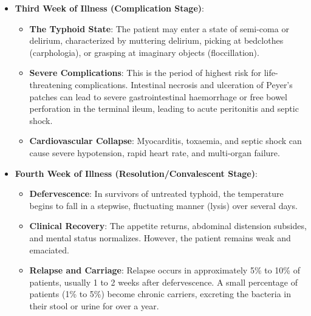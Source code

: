 \begin{itemize}
\begin{itemize}
    \item \textbf{Abdominal Distension and Organomegaly}: The abdomen becomes distended, and tenderness in the right iliac fossa is common. Palpation may reveal splenomegaly and hepatomegaly. Diarrhoea may develop, characteristically described as watery, green-brown ``pea-soup'' stools.
    \item \textbf{Toxic Appearance}: The patient appears severely ill, showing marked apathy, lethargy, and a dull, expressionless look.
  \end{itemize}
  \item \textbf{Third Week of Illness (Complication Stage)}:
  \begin{itemize}
    \item \textbf{The Typhoid State}: The patient may enter a state of semi-coma or delirium, characterized by muttering delirium, picking at bedclothes (carphologia), or grasping at imaginary objects (floccillation).
    \item \textbf{Severe Complications}: This is the period of highest risk for life-threatening complications. Intestinal necrosis and ulceration of Peyer's patches can lead to severe gastrointestinal haemorrhage or free bowel perforation in the terminal ileum, leading to acute peritonitis and septic shock.
    \item \textbf{Cardiovascular Collapse}: Myocarditis, toxaemia, and septic shock can cause severe hypotension, rapid heart rate, and multi-organ failure.
  \end{itemize}
  \item \textbf{Fourth Week of Illness (Resolution/Convalescent Stage)}:
  \begin{itemize}
    \item \textbf{Defervescence}: In survivors of untreated typhoid, the temperature begins to fall in a stepwise, fluctuating manner (lysis) over several days.
    \item \textbf{Clinical Recovery}: The appetite returns, abdominal distension subsides, and mental status normalizes. However, the patient remains weak and emaciated.
    \item \textbf{Relapse and Carriage}: Relapse occurs in approximately 5\% to 10\% of patients, usually 1 to 2 weeks after defervescence. A small percentage of patients (1\% to 5\%) become chronic carriers, excreting the bacteria in their stool or urine for over a year.
  \end{itemize}
\end{itemize}

